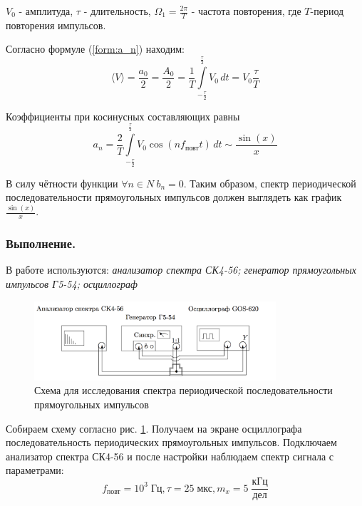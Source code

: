 \documentclass[a4paper, 12pt,twoside]{article}
\begin{document}
$V_0$  - амплитуда, $\tau$ - длительность, $\Omega_{1} = \frac{2\pi}{T} $ - частота повторения, где $T$-период повторения импульсов.

Согласно формуле (\ref{form:a_n}) находим:
$$ \langle V \rangle = \frac{a_0}{2} = \frac{A_0}{2} = \frac{1}{T}\int\limits_{ -\frac{\tau}{2}}  ^ {\frac{\tau}{2} } V_0\,dt = V_0 \frac{\tau}{T}
$$

Коэффициенты при косинусных составляющих равны
\begin{equation}
\label{form:app_a_n}
	a_n = \frac{2}{T}\int\limits_{ -\frac{\tau}{2} } ^ {\frac{\tau}{2} } V_0\cos(nf_\text{повт}t)\, dt \sim \frac{\sin(x)}{x}
\end{equation}
 
В силу чётности функции $\forall n \in {N} \ b_n=0$. Таким образом, спектр периодической последовательности прямоугольных импульсов должен выглядеть как график $\frac{\sin(x)}{x}$.
\subsubsection*{Выполнение.}
В работе используются: \textit{анализатор спектра СК4-56; генератор прямоугольных импульсов Г5-54; осциллограф}



\begin{figure}[H]
\centering
\includegraphics[width = 0.8\textwidth]{schemeA}
\caption{Схема для исследования спектра периодической последовательности прямоугольных импульсов}
\label{img:scheme A}
\end{figure}

Собираем схему согласно рис. \ref{img:scheme A}. Получаем на экране осциллографа последовательность периодических прямоугольных импульсов. Подключаем анализатор спектра СК4-56 и после настройки наблюдаем спектр сигнала с параметрами: $$f_\text{повт} = 10^3 \; \text{Гц}, \tau = 25 \; \text{мкс}, m_x = 5 \; \frac{\text{кГц}}{\text{дел}}$$

\newpage
\end{document}
